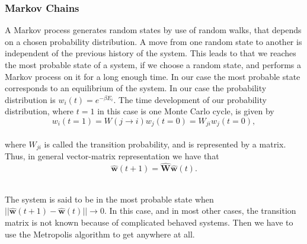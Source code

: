 \documentclass[12pt]{article}
\begin{document}
\begin{flushleft}
\subsubsection{Markov Chains}
A Markov process generates random states by use of random walks, that depends on a chosen probability distribution. A move from one random state to another is independent of the previous history of the system. This leads to that we reaches the most probable state of a system, if we choose a random state, and performs a Markov process on it for a long enough time. In our case the most probable state corresponds to an equilibrium of the system. 
In our case the probability distribution is $w_i(t) = e^{-\beta E_i}$. The time development of our probability distribution, where $t=1$ in this case is one Monte Carlo cycle, is given by
\vspace{5mm}
$$w_i(t=1) = W(j\rightarrow i)w_j(t=0) = W_{ji}w_j(t=0),$$\\
\vspace{5mm} 
where $W_{ji}$ is called the transition probability, and is represented by a matrix. Thus, in general vector-matrix representation we have that
\vspace{5mm}
$$\boldsymbol{\hat{w}}(t+1) = \boldsymbol{\hat{W}}\boldsymbol{\hat{w}}(t).$$\\
\vspace{5mm}

The system is said to be in the most probable state when $||\boldsymbol{\hat{w}}(t+1) -\boldsymbol{\hat{w}}(t)||\rightarrow 0$. In this case, and in most other cases, the transition matrix is not known because of complicated behaved systems. Then we have to use the Metropolis algorithm to get anywhere at all. 


\end{flushleft}
\end{document}
